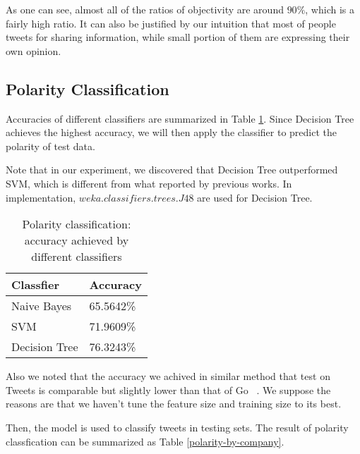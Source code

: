 \documentclass[12pt]{article}
\begin{document}
As one can see, almost all of the ratios of objectivity are around $90\%$, which is a fairly high ratio. It can also be justified by our intuition that most of people tweets for sharing information, while small portion of them are expressing their own opinion.

\subsection{Polarity Classification}
Accuracies of different classifiers are summarized in Table \ref{classifiers-polarity}. Since Decision Tree achieves the highest accuracy, we will then apply the classifier to predict the polarity of test data.

Note that in our experiment, we discovered that Decision Tree outperformed SVM, which is different from what reported by previous works. In implementation, $weka.classifiers.trees.J48$ are used for Decision Tree.

\begin{table}
\begin{center}
    \begin{tabular}{ | l || l | }
        \hline
        \textbf{Classfier} &  \textbf{Accuracy} \\ \hline
        \hline
        Naive Bayes &  65.5642\% \\ \hline
        SVM & 71.9609\% \\ \hline
        Decision Tree & 76.3243\% \\ \hline
    \end{tabular}
\caption{Polarity classification: accuracy achieved by different classifiers}
\label{classifiers-polarity}
\end{center}
\end{table}

Also we noted that the accuracy we achived in similar method that test on Tweets is comparable but slightly lower than that of Go \etal~\cite{Go:09}. We suppose the reasons are that we haven't tune the feature size and training size to its best.

Then, the model is used to classify tweets in testing sets. The result of polarity classfication can be summarized as Table \ref{polarity-by-company}.
\end{document}
